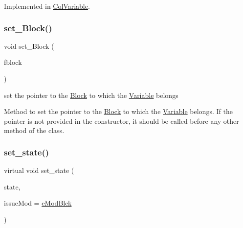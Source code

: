 Implemented in \mbox{\hyperlink{class_s_m_spp__di__unipi__it_1_1_col_variable_a03fd45a15a7b0b5dba25fe9f4ea983fe}{Col\+Variable}}.

\mbox{\label{class_s_m_spp__di__unipi__it_1_1_variable_ae25adfb4d0355dc999de19a850b0025d}} 
\subsubsection{\texorpdfstring{set\+\_\+\+Block()}{set\_Block()}}
{\footnotesize\ttfamily void set\+\_\+\+Block (\begin{DoxyParamCaption}\item[{\mbox{\hyperlink{class_s_m_spp__di__unipi__it_1_1_block}{Block}} $\ast$}]{fblock }\end{DoxyParamCaption})\hspace{0.3cm}{\ttfamily [inline]}}



set the pointer to the \mbox{\hyperlink{class_s_m_spp__di__unipi__it_1_1_block}{Block}} to which the \mbox{\hyperlink{class_s_m_spp__di__unipi__it_1_1_variable}{Variable}} belongs 

Method to set the pointer to the \mbox{\hyperlink{class_s_m_spp__di__unipi__it_1_1_block}{Block}} to which the \mbox{\hyperlink{class_s_m_spp__di__unipi__it_1_1_variable}{Variable}} belongs. If the pointer is not provided in the constructor, it should be called before any other method of the class. \mbox{\label{class_s_m_spp__di__unipi__it_1_1_variable_a2520cb209ab7d71c22789de6e94f0487}} 
\subsubsection{\texorpdfstring{set\+\_\+state()}{set\_state()}}
{\footnotesize\ttfamily virtual void set\+\_\+state (\begin{DoxyParamCaption}\item[{const \mbox{\hyperlink{class_s_m_spp__di__unipi__it_1_1_variable_a32378add5594ab0f1fb45e711d88924d}{var\+\_\+type}}}]{state,  }\item[{\mbox{\hyperlink{group___modification___t_y_p_e_s_ga544246d8c462e9a2d817c2c30797968f}{c\+\_\+\+Mod\+Param}}}]{issue\+Mod = {\ttfamily \mbox{\hyperlink{group___modification___t_y_p_e_s_gga48fddcdd03a03f49b7e389ca1ed938d4a21b14b26b1c0093a0905f6fc010bad29}{e\+Mod\+Blck}}} }\end{DoxyParamCaption})\hspace{0.3cm}{\ttfamily [virtual]}}



